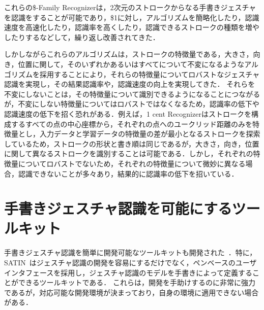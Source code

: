 これらの\$-Family Recognizerは，2次元のストロークからなる手書きジェスチャを認識をすることが可能であり，\$1に対し，アルゴリズムを簡略化したり，認識速度を高速化したり，認識率を高くしたり，認識できるストロークの種類を増やしたりするなどして，繰り返し改善されてきた．

しかしながらこれらのアルゴリズムは，ストロークの特徴量である，大きさ，向き，位置に関して，そのいずれかあるいはすべてについて不変になるようなアルゴリズムを採用することにより，それらの特徴量についてロバストなジェスチャ認識を実現し，その結果認識率や，認識速度の向上を実現してきた．
それらを不変にしないことは，その特徴量について識別できるようになることにつながるが，不変にしない特徴量についてはロバストではなくなるため，認識率の低下や認識速度の低下を招く恐れがある．例えば，1 cent Recognizerはストロークを構成するすべての点の中心座標から，それぞれの点へのユークリッド距離のみを特徴量とし，入力データと学習データの特徴量の差が最小となるストロークを探索しているため，ストロークの形状と書き順は同じであるが，大きさ，向き，位置に関して異なるストロークを識別することは可能である．しかし，それぞれの特徴量についてロバストでないため，それぞれの特徴量について微妙に異なる場合，認識できないことが多々あり，結果的に認識率の低下を招いている．

\section{手書きジェスチャ認識を可能にするツールキット}
手書きジェスチャ認識を簡単に開発可能なツールキットも開発された~\cite{Henry:1990:IGS:97924.97938,Landay:1993:EEU:259964.260123,Myers:1997:AEN:262050.260628}．特に，SATIN~\cite{Hong:2000:STI:354401.354412}はジェスチャ認識の開発を容易にするだけでなく，ペンベースのユーザインタフェースを採用し，ジェスチャ認識のモデルを手書きによって定義することができるツールキットである．
これらは，開発を手助けするのに非常に強力であるが，対応可能な開発環境が決まっており，自身の環境に適用できない場合がある．

